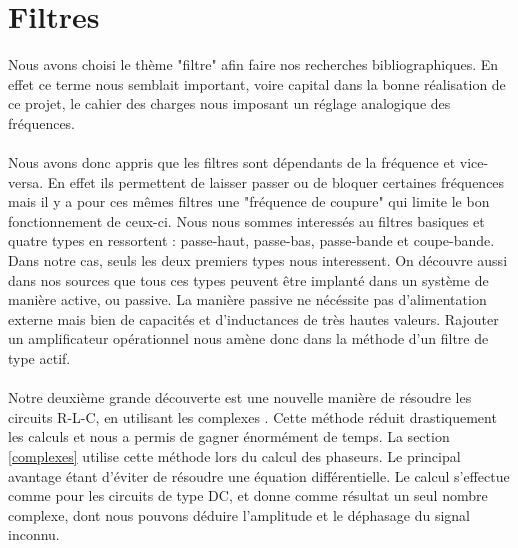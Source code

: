 \section{Filtres}
Nous avons choisi le thème "filtre" afin faire nos recherches bibliographiques. En effet ce terme nous semblait important, voire capital dans la bonne réalisation de ce projet, le cahier des charges nous imposant un réglage analogique des fréquences.

\paragraph{}
Nous avons donc appris que les filtres sont dépendants de la fréquence et vice-versa. En effet ils permettent de laisser passer ou de bloquer certaines fréquences mais il y a pour ces mêmes filtres une "fréquence de coupure" qui limite le bon fonctionnement de ceux-ci. Nous nous sommes interessés au filtres basiques et quatre types en ressortent : passe-haut, passe-bas, passe-bande et coupe-bande. Dans notre cas, seuls les deux premiers types nous interessent. On découvre aussi dans nos sources que tous ces types peuvent être implanté dans un système de manière active, ou passive. La manière passive ne nécéssite pas d'alimentation externe mais bien de capacités et d'inductances de très hautes valeurs. Rajouter un amplificateur opérationnel nous amène donc dans la méthode d'un filtre de type actif. \cite[p.~249-251]{Kularatna}

\paragraph{}
Notre deuxième grande découverte est une nouvelle manière de résoudre les circuits R-L-C, en utilisant les complexes \cite[p. 375-379]{Irwin}. Cette méthode réduit drastiquement les calculs et nous a permis de gagner énormément de temps. La section \ref{complexes} utilise cette méthode lors du calcul des phaseurs. Le principal avantage étant d'éviter de résoudre une équation différentielle. Le calcul s'effectue comme pour les circuits de type DC, et donne comme résultat un seul nombre complexe, dont nous pouvons déduire l'amplitude et le déphasage du signal inconnu.